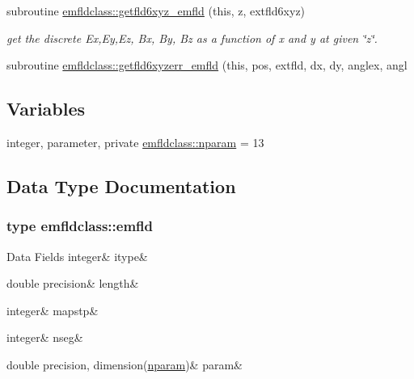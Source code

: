 \begin{DoxyCompactItemize}
\item 
subroutine \mbox{\hyperlink{namespaceemfldclass_a6a4833c66a8430fe7d7c3e005dd34c6e}{emfldclass\+::getfld6xyz\+\_\+emfld}} (this, z, extfld6xyz)
\begin{DoxyCompactList}\small\item\em get the discrete Ex,Ey,Ez, Bx, By, Bz as a function of x and y at given \char`\"{}z\char`\"{}. \end{DoxyCompactList}\item 
subroutine \mbox{\hyperlink{namespaceemfldclass_a53a2dd6514711afd20442dab5686c5a4}{emfldclass\+::getfld6xyzerr\+\_\+emfld}} (this, pos, extfld, dx, dy, anglex, angl
\end{DoxyCompactItemize}
\subsection*{Variables}
\begin{DoxyCompactItemize}
\item 
integer, parameter, private \mbox{\hyperlink{namespaceemfldclass_ad6fed90f4153b92a9a9ff35a6ef146c3}{emfldclass\+::nparam}} = 13
\end{DoxyCompactItemize}


\subsection{Data Type Documentation}
\label{structemfldclass_1_1emfld}
\subsubsection{type emfldclass\+::emfld}
\begin{DoxyFields}{Data Fields}
\mbox{\label{namespaceemfldclass_aa9a88075072a030b64fd3878793b499b}} 
integer&
itype&
\\
\hline

\mbox{\label{namespaceemfldclass_a4938896636fb9fa907f15b621831cf97}} 
double precision&
length&
\\
\hline

\mbox{\label{namespaceemfldclass_ac18dfbe320fc1dc13393780eb0ae2613}} 
integer&
mapstp&
\\
\hline

\mbox{\label{namespaceemfldclass_a35f0c51ff70d545cef92bbbfa9546006}} 
integer&
nseg&
\\
\hline

\mbox{\label{namespaceemfldclass_ac4480d690e4e4d88d88ba939af8213cd}} 
double precision, dimension(\mbox{\hyperlink{namespaceemfldclass_ad6fed90f4153b92a9a9ff35a6ef146c3}{nparam}})&
param&
\\
\hline

\end{DoxyFields}

